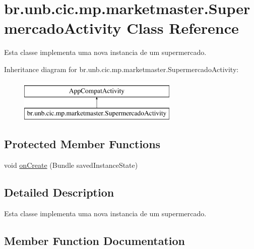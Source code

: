 \hypertarget{classbr_1_1unb_1_1cic_1_1mp_1_1marketmaster_1_1SupermercadoActivity}{}\section{br.\+unb.\+cic.\+mp.\+marketmaster.\+Supermercado\+Activity Class Reference}
\label{classbr_1_1unb_1_1cic_1_1mp_1_1marketmaster_1_1SupermercadoActivity}


Esta classe implementa uma nova instancia de um supermercado.  


Inheritance diagram for br.\+unb.\+cic.\+mp.\+marketmaster.\+Supermercado\+Activity\+:\begin{figure}[H]
\begin{center}
\leavevmode
\includegraphics[height=2.000000cm]{classbr_1_1unb_1_1cic_1_1mp_1_1marketmaster_1_1SupermercadoActivity}
\end{center}
\end{figure}
\subsection*{Protected Member Functions}
\begin{DoxyCompactItemize}
\item 
void \mbox{\hyperlink{classbr_1_1unb_1_1cic_1_1mp_1_1marketmaster_1_1SupermercadoActivity_a0a2f5cf0b159f73d22c85bd027bc649a}{on\+Create}} (Bundle saved\+Instance\+State)
\end{DoxyCompactItemize}


\subsection{Detailed Description}
Esta classe implementa uma nova instancia de um supermercado. 

\subsection{Member Function Documentation}
\mbox{\label{classbr_1_1unb_1_1cic_1_1mp_1_1marketmaster_1_1SupermercadoActivity_a0a2f5cf0b159f73d22c85bd027bc649a}} 
